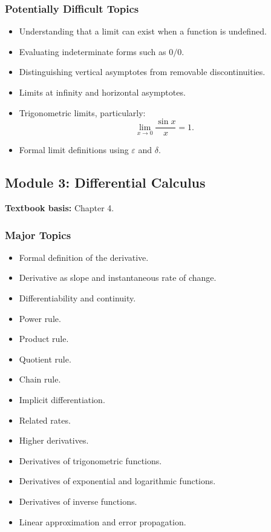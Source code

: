 \documentclass[11pt]{article}
\begin{document}
\subsubsection*{Potentially Difficult Topics}

\begin{itemize}
    \item Understanding that a limit can exist when a function is undefined.
    \item Evaluating indeterminate forms such as \(0/0\).
    \item Distinguishing vertical asymptotes from removable discontinuities.
    \item Limits at infinity and horizontal asymptotes.
    \item Trigonometric limits, particularly:
    \[
    \lim_{x\to 0}\frac{\sin x}{x}=1.
    \]
    \item Formal limit definitions using \(\varepsilon\) and \(\delta\).
\end{itemize}

\subsection{Module 3: Differential Calculus}

\textbf{Textbook basis:} Chapter 4.

\subsubsection*{Major Topics}

\begin{itemize}
    \item Formal definition of the derivative.
    \item Derivative as slope and instantaneous rate of change.
    \item Differentiability and continuity.
    \item Power rule.
    \item Product rule.
    \item Quotient rule.
    \item Chain rule.
    \item Implicit differentiation.
    \item Related rates.
    \item Higher derivatives.
    \item Derivatives of trigonometric functions.
    \item Derivatives of exponential and logarithmic functions.
    \item Derivatives of inverse functions.
    \item Linear approximation and error propagation.
\end{itemize}
\end{document}
